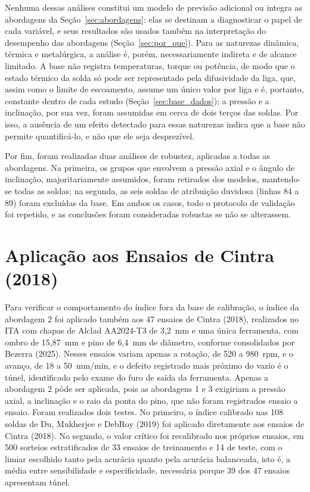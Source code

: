 \documentclass[12pt,openany]{report}
\begin{document}
Nenhuma dessas análises constitui um modelo de previsão adicional ou integra as abordagens da Seção~\ref{sec:abordagens}: elas se destinam a diagnosticar o papel de cada variável, e seus resultados são usados também na interpretação do desempenho das abordagens (Seção~\ref{sec:por_que}). Para as naturezas dinâmica, térmica e metalúrgica, a análise é, porém, necessariamente indireta e de alcance limitado. A base não registra temperaturas, torque ou potência, de modo que o estado térmico da solda só pode ser representado pela difusividade da liga, que, assim como o limite de escoamento, assume um único valor por liga e é, portanto, constante dentro de cada estudo (Seção~\ref{sec:base_dados}); a pressão e a inclinação, por sua vez, foram assumidas em cerca de dois terços das soldas. Por isso, a ausência de um efeito detectado para essas naturezas indica que a base não permite quantificá-lo, e não que ele seja desprezível.

Por fim, foram realizadas duas análises de robustez, aplicadas a todas as abordagens. Na primeira, os grupos que envolvem a pressão axial e o ângulo de inclinação, majoritariamente assumidos, foram retirados dos modelos, mantendo-se todas as soldas; na segunda, as seis soldas de atribuição duvidosa (linhas 84 a 89) foram excluídas da base. Em ambos os casos, todo o protocolo de validação foi repetido, e as conclusões foram consideradas robustas se não se alterassem.

\section{Aplicação aos Ensaios de Cintra (2018)}
\label{sec:met_cintra}

Para verificar o comportamento do índice fora da base de calibração, o índice da abordagem 2 foi aplicado também aos 47 ensaios de Cintra (2018), realizados no ITA com chapas de Alclad AA2024-T3 de 3,2~mm e uma única ferramenta, com ombro de 15,87~mm e pino de 6,4~mm de diâmetro, conforme consolidados por Bezerra (2025). Nesses ensaios variam apenas a rotação, de 520 a 980~rpm, e o avanço, de 18 a 50~mm/min, e o defeito registrado mais próximo do vazio é o túnel, identificado pelo exame do furo de saída da ferramenta. Apenas a abordagem 2 pôde ser aplicada, pois as abordagens 1 e 3 exigiriam a pressão axial, a inclinação e o raio da ponta do pino, que não foram registrados ensaio a ensaio. Foram realizados dois testes. No primeiro, o índice calibrado nas 108 soldas de Du, Mukherjee e DebRoy (2019) foi aplicado diretamente aos ensaios de Cintra (2018). No segundo, o valor crítico foi recalibrado nos próprios ensaios, em 500 sorteios estratificados de 33 ensaios de treinamento e 14 de teste, com o limiar escolhido tanto pela acurácia quanto pela acurácia balanceada, isto é, a média entre sensibilidade e especificidade, necessária porque 39 dos 47 ensaios apresentam túnel.
\end{document}

